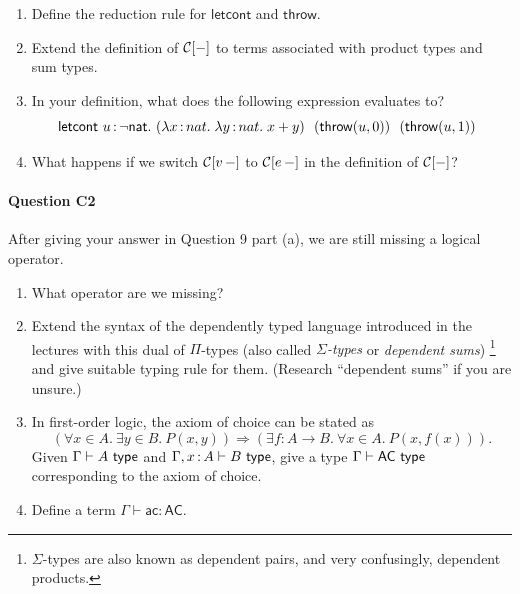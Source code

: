 \documentclass[11pt,a4paper,twoside]{article}
\begin{document}
\begin{enumerate}[label=(\alph*)]
  \item Define the reduction rule for $\mathsf{letcont}$ and $\mathsf{throw}$.

  \item Extend the definition of $\mathcal{C}[-]$ to terms associated with
    product types and sum types.

  \item In your definition, what does the following expression evaluates to?
    \[
      \mathsf{letcont}\ u \,{:}\, \neg \mathsf{nat}.\
      (\lambda x \,{:}\, nat .\; \lambda y \,{:}\, nat .\; x + y)\ \
      (\mathsf{throw}(u, 0))\ \
      (\mathsf{throw}(u, 1))\ \
    \]

  \item What happens if we switch $\mathcal{C}[v \, -]$ to $\mathcal{C}[e \, -]$
    in the definition of $\mathcal{C}[-]$?

\end{enumerate}

\paragraph{Question C2} After giving your answer in Question 9 part
(a), we are still missing a logical operator.
\begin{enumerate}[label=(\alph*)]
  \item What operator are we missing?

  \item Extend the syntax of the dependently typed language
    introduced in the lectures with this dual of $\Pi$-types
    (also called \emph{$\Sigma$-types} or \emph{dependent sums})
    \footnote{$\Sigma$-types are also known as dependent pairs, and
    very confusingly, dependent products.}
    and give suitable typing rule for them.
    (Research ``dependent sums'' if you are unsure.)

  \item In first-order logic, the axiom of choice can be stated as
    \[
      (\forall x \in A.\ \exists y \in B.\ P (x, y))
      \Rightarrow
      (\exists f : A \to B.\ \forall x \in A.\ P(x, f(x))).
    \]
    Given $\Gamma \vdash A\ \mathsf{type}$ and $\Gamma, x \,{:}\, A \vdash B\ \mathsf{type}$,
    give a type $\Gamma \vdash \mathsf{AC}\ \type$ corresponding to
    the axiom of choice.

  \item Define a term $\Gamma \vdash \mathsf{ac} : \mathsf{AC}$.
\end{enumerate}
\end{document}
